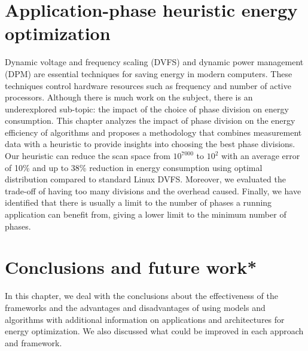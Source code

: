 \documentclass[
papersize=a4,
pagelayout=default,
fontname=latinmodern,
fontsize=11pt,
twoside,
final,
faculty=fpms,
]{umons-Thesis}
\begin{document}
	\chapter{Application-phase heuristic energy optimization} \label{chapter:phases}
	Dynamic voltage and frequency scaling (DVFS) and dynamic power management (DPM) are essential techniques for saving energy in modern computers. These techniques control hardware resources such as frequency and number of active processors. Although there is much work on the subject, there is an underexplored sub-topic: the impact of the choice of phase division on energy consumption.
	This chapter analyzes the impact of phase division on the energy efficiency of algorithms and proposes a methodology that combines measurement data with a heuristic to provide insights into choosing the best phase divisions.
	Our heuristic can reduce the scan space from $10^{7000}$ to $10^2$ with an average error of 10\% and up to 38\% reduction in energy consumption using optimal distribution compared to standard Linux DVFS. Moreover, we evaluated the trade-off of having too many divisions and the overhead caused. Finally, we have identified that there is usually a limit to the number of phases a running application can benefit from, giving a lower limit to the minimum number of phases.
	
	
	
	\chapter{Conclusions and future work*} \label{chapter:conclusions}
	In this chapter, we deal with the conclusions about the effectiveness of the frameworks and the advantages and disadvantages of using models and algorithms with additional information on applications and architectures for energy optimization.
	We also discussed what could be improved in each approach and framework.
	
	
	
	
	\backmatter
	
\end{document}
